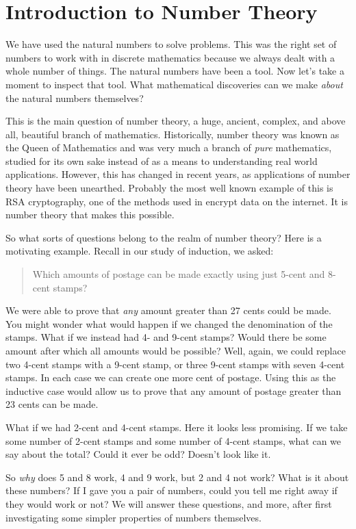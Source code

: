 \documentclass[12pt]{article}
\begin{document}
\section{Introduction to Number Theory}

We have used the natural numbers to solve problems.  This was the right set of numbers to work with in discrete mathematics because we always dealt with a whole number of things.  The natural numbers have been a tool.  Now let's take a moment to inspect that tool.  What mathematical discoveries can we make {\em about} the natural numbers themselves?

This is the main question of number theory, a huge, ancient, complex, and above all, beautiful branch of mathematics.  Historically, number theory was known as the Queen of Mathematics and was very much a branch of {\em pure} mathematics, studied for its own sake instead of as a means to understanding real world applications.  However, this has changed in recent years, as applications of number theory have been unearthed.  Probably the most well known example of this is RSA cryptography, one of the methods used in encrypt data on the internet.  It is number theory that makes this possible.

So what sorts of questions belong to the realm of number theory?  Here is a motivating example.  Recall in our study of induction, we asked:

\begin{quote}
	Which amounts of postage can be made exactly using just 5-cent and 8-cent stamps?
\end{quote}

We were able to prove that {\em any} amount greater than 27 cents could be made.  You might wonder what would happen if we changed the denomination of the stamps.  What if we instead had 4- and 9-cent stamps?  Would there be some amount after which all amounts would be possible?  Well, again, we could replace two 4-cent stamps with a 9-cent stamp, or three 9-cent stamps with seven 4-cent stamps.  In each case we can create one more cent of postage.  Using this as the inductive case would allow us to prove that any amount of postage greater than 23 cents can be made.  

What if we had 2-cent and 4-cent stamps.  Here it looks less promising.  If we take some number of 2-cent stamps and some number of 4-cent stamps, what can we say about the total?  Could it ever be odd?  Doesn't look like it.  

So {\em why} does 5 and 8 work, 4 and 9 work, but 2 and 4 not work?  What is it about these numbers?  If I gave you a pair of numbers, could you tell me right away if they would work or not?  We will answer these questions, and more, after first investigating some simpler properties of numbers themselves.
\end{document}
